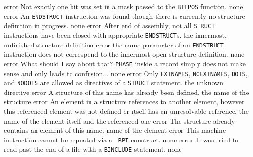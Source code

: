 \documentclass[12pt,twoside]{report}
\newcommand{\tty}[1]{{\tt #1}}
\begin{document}
\begin{description}
               {error}
               {Not exactly one bit was set in a mask passed to the
                \tty{BITPOS} function.}
               {none}
               {error}
               {An \tty{ENDSTRUCT} instruction was found though there is
                currently no structure definition in progress.}
               {none}
               {error}
               {After end of assembly, not all \tty{STRUCT} instructions
                have been closed with appropriate \tty{ENDSTRUCT}s.}
               {the innermost, unfinished structure definition}
               {error}
               {the name parameter of an \tty{ENDSTRUCT} instruction does
                not correspond to the innermost open structure
                definition.}
               {none}
               {error}
               {What should I say about that?  \tty{PHASE} inside a record
                simply does not make sense and only leads to
                confusion...}
               {none}
\errentry{1554}{invalid \tty{STRUCT} directive}
               {error}
               {Only \tty{EXTNAMES}, \tty{NOEXTNAMES}, \tty{DOTS},
                and \tty{NODOTS} are allowed as directives of a
                \tty{STRUCT} statement.}
               {the unknown directive}
               {error}
               {A structure of this name has already been defined.}
               {the name of the structure}
               {error}
               {An element in a structure references to another
                element, however this referenced element was not
                defined or itself has an unresolvable reference.}
               {the name of the element itself and the referenced one}
               {error}
               {The structure already contains an element of this name.}
               {name of the element}
               {error}
               {This machine instruction cannot be repeated via a {\tt
                RPT} construct.}
               {none}
               {error}
               {It was tried to read past the end of a file with a
                \tty{BINCLUDE} statement.}
               {none}

\end{description}
\end{document}
